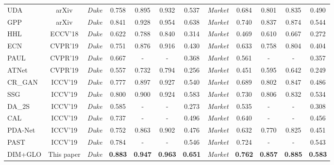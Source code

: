 \documentclass[sigconf]{acmart}
\begin{document}
\begin{table*}[t]
\begin{center}
{\begin{tabular}{l|c|c|c|c|c|c||c|c|c|c|c}
UDA~\cite{adaptive-reid} & arXiv
&\textit{Duke}&0.758&0.895&0.932&0.537
&\textit{Market}&0.684&0.801&0.835&0.490\\
GPP~\cite{zhong2019learning} & arXiv
&\textit{Duke}& 0.841&0.928&0.954&0.638
&\textit{Market}&0.740&0.837&0.874&0.544\\
HHL~\cite{zhong2018generalizing} & ECCV'18
&\textit{Duke}& 0.622&0.788&0.840&0.314
&\textit{Market}&0.469&0.610&0.667&0.272\\
ECN~\cite{zhong2019invariance} & CVPR'19
&\textit{Duke}& 0.751&0.876&0.916&0.430
&\textit{Market}&0.633&0.758&0.804&0.404\\
PAUL~\cite{yang2019patch}& CVPR'19
&\textit{Duke}& 0.667&-&-&0.368
&\textit{Market}&0.561&-&-&0.357\\
ATNet~\cite{Liu_2019_CVPR}&CVPR'19
&\textit{Duke}&0.557&0.732&0.794&0.256
&\textit{Market}&0.451&0.595&0.642&0.249\\
CR\_GAN\cite{Chen_2019_ICCV} & ICCV'19
&\textit{Duke}& 0.777&0.897&0.927&0.540
&\textit{Market}&0.689&0.802&0.847&0.486\\
SSG~\cite{ssg} & ICCV'19
&\textit{Duke}&0.800&0.900&0.924&0.583
&\textit{Market}&0.730&0.806&0.832&0.534\\
DA\_2S~\cite{huang2019sbsgan}&ICCV'19
&\textit{Duke}&0.585&-&-&0.273
&\textit{Market}&0.535&-&-&0.308\\
CAL~\cite{Qi_2019_ICCV}&ICCV'19
&\textit{Duke}&0.737&-&-&0.496
&\textit{Market}&0.640&-&-&0.456\\
PDA-Net~\cite{Li_2019_ICCV}&ICCV'19
&\textit{Duke}&0.752&0.863&0.902&0.476
&\textit{Market}&0.632&0.770&0.825&0.451\\
PAST~\cite{Zhang_2019_ICCV}&ICCV'19
&\textit{Duke}&0.784&-&-&0.546
&\textit{Market}&0.724&-&-&0.543\\
\hline
DIM+GLO &This paper
&\textit{Duke}&\textbf{0.883}&\textbf{0.947}&\textbf{0.963}&\textbf{0.651}
&\textit{Market}&\textbf{0.762}&\textbf{0.857}&\textbf{0.885}&\textbf{0.583}\\
\hline
\end{tabular}}
\end{center}
\label{tab:compared-others}
\vspace{-2mm}
\end{table*}
\end{document}
